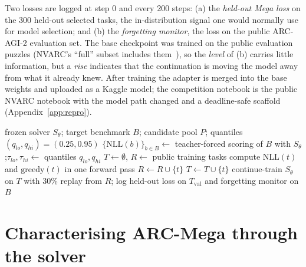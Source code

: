 \documentclass[11pt]{article}
\newcommand{\nvarc}{NVARC}
\newcommand{\mega}{ARC-Mega}
\begin{document}
Two losses are logged at step 0 and every 200 steps: (a) the \emph{held-out Mega loss} on the 300 held-out selected tasks, the in-distribution signal one would normally use for model selection; and (b) the \emph{forgetting monitor}, the loss on the public ARC-AGI-2 evaluation set. The base checkpoint was trained on the public evaluation puzzles (\nvarc{}'s ``full'' subset includes them~\citep{nvarc2025}), so the \emph{level} of (b) carries little information, but a \emph{rise} indicates that the continuation is moving the model away from what it already knew. After training the adapter is merged into the base weights and uploaded as a Kaggle model; the competition notebook is the public \nvarc{} notebook with the model path changed and a deadline-safe scaffold (Appendix~\ref{app:repro}).

\begin{algorithm}[t]
\caption{Solver-in-the-loop band selection}
\label{alg:band}
\begin{algorithmic}[1]
\Require frozen solver $S_\theta$; target benchmark $B$; candidate pool $P$; quantiles $(q_{lo},q_{hi})=(0.25,0.95)$
\State $\{\mathrm{NLL}(b)\}_{b\in B}\gets$ teacher-forced scoring of $B$ with $S_\theta$;\quad $\tau_{lo},\tau_{hi}\gets$ quantiles $q_{lo},q_{hi}$
\State $T\gets\emptyset$, $R\gets$ public training tasks
  \State compute $\mathrm{NLL}(t)$ and $\mathrm{greedy}(t)$ in one forward pass
   $R\gets R\cup\{t\}$ 
   $T\gets T\cup\{t\}$ 
  \EndIf
\EndFor
\State continue-train $S_\theta$ on $T$ with 30\% replay from $R$; log held-out loss on $T_{\mathrm{val}}$ and forgetting monitor on $B$
\end{algorithmic}
\end{algorithm}

\section{Characterising \mega{} through the solver}
\label{sec:mega}
\end{document}
